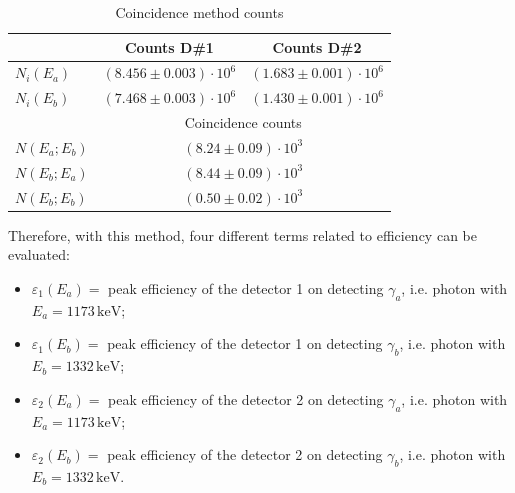 \documentclass[a4paper]{article}
\begin{document}
\begin{table}[H]
    \centering
    \begin{tabular}{|l|cc|}
    \hline
        &Counts D\#1&Counts D\#2\\
        \hline
        $N_i(E_a)$ & $(8.456\pm0.003)\cdot10^6$ &$(1.683\pm0.001)\cdot10^6$\\
        $N_i(E_b)$ &$(7.468\pm0.003)\cdot10^6$ &$(1.430\pm0.001)\cdot10^6$\\
        \hline
         &\multicolumn{2}{c|}{Coincidence counts}\\
         \hline
       $N(E_a;E_b)$ &\multicolumn{2}{c|}{$(8.24\pm0.09)\cdot10^3$}\\
       $N(E_b;E_a)$ &\multicolumn{2}{c|}{$(8.44\pm0.09)\cdot10^3$}\\
       $N(E_b;E_b)$ &\multicolumn{2}{c|}{$(0.50\pm0.02)\cdot10^3$} \\
       \hline
    \end{tabular}
    \caption{Coincidence method counts}
    \label{tab: coincidence method}
    \label{tab: coincidence method}
\end{table}


Therefore, with this method, four different terms related to efficiency can be evaluated:
\begin{itemize}
    \item [-] $\varepsilon_{1}(E_a)=$ peak efficiency of the detector 1 on detecting $\gamma_a$, i.e. photon with $E_a=1173\,\mathrm{keV}$;
    \item[-] $\varepsilon_{1}(E_b)=$ peak efficiency of the detector 1 on detecting $\gamma_b$, i.e. photon with $E_b=1332\,\mathrm{keV}$;
    \item [-] $\varepsilon_{2}(E_a)=$ peak efficiency of the detector 2 on detecting $\gamma_a$, i.e. photon with $E_a=1173\,\mathrm{keV}$;
    \item[-] $\varepsilon_{2}
    (E_b)=$ peak efficiency of the detector 2 on detecting $\gamma_b$, i.e. photon with $E_b=1332\,\mathrm{keV}$.
\end{itemize}
\end{document}
